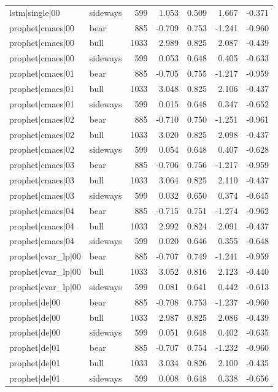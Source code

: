 \begin{table}
\begin{tabular}{llrrrrr}
lstm|single|00 & sideways & 599 & 1.053 & 0.509 & 1.667 & -0.371 \\
prophet|cmaes|00 & bear & 885 & -0.709 & 0.753 & -1.241 & -0.960 \\
prophet|cmaes|00 & bull & 1033 & 2.989 & 0.825 & 2.087 & -0.439 \\
prophet|cmaes|00 & sideways & 599 & 0.053 & 0.648 & 0.405 & -0.633 \\
prophet|cmaes|01 & bear & 885 & -0.705 & 0.755 & -1.217 & -0.959 \\
prophet|cmaes|01 & bull & 1033 & 3.048 & 0.825 & 2.106 & -0.437 \\
prophet|cmaes|01 & sideways & 599 & 0.015 & 0.648 & 0.347 & -0.652 \\
prophet|cmaes|02 & bear & 885 & -0.710 & 0.750 & -1.251 & -0.961 \\
prophet|cmaes|02 & bull & 1033 & 3.020 & 0.825 & 2.098 & -0.437 \\
prophet|cmaes|02 & sideways & 599 & 0.054 & 0.648 & 0.407 & -0.628 \\
prophet|cmaes|03 & bear & 885 & -0.706 & 0.756 & -1.217 & -0.959 \\
prophet|cmaes|03 & bull & 1033 & 3.064 & 0.825 & 2.110 & -0.437 \\
prophet|cmaes|03 & sideways & 599 & 0.032 & 0.650 & 0.374 & -0.645 \\
prophet|cmaes|04 & bear & 885 & -0.715 & 0.751 & -1.274 & -0.962 \\
prophet|cmaes|04 & bull & 1033 & 2.992 & 0.824 & 2.091 & -0.437 \\
prophet|cmaes|04 & sideways & 599 & 0.020 & 0.646 & 0.355 & -0.648 \\
prophet|cvar\_lp|00 & bear & 885 & -0.707 & 0.749 & -1.241 & -0.959 \\
prophet|cvar\_lp|00 & bull & 1033 & 3.052 & 0.816 & 2.123 & -0.440 \\
prophet|cvar\_lp|00 & sideways & 599 & 0.081 & 0.641 & 0.442 & -0.613 \\
prophet|de|00 & bear & 885 & -0.708 & 0.753 & -1.237 & -0.960 \\
prophet|de|00 & bull & 1033 & 2.987 & 0.825 & 2.086 & -0.439 \\
prophet|de|00 & sideways & 599 & 0.051 & 0.648 & 0.402 & -0.635 \\
prophet|de|01 & bear & 885 & -0.707 & 0.754 & -1.232 & -0.960 \\
prophet|de|01 & bull & 1033 & 3.034 & 0.826 & 2.100 & -0.435 \\
prophet|de|01 & sideways & 599 & 0.008 & 0.648 & 0.338 & -0.656 \\

\end{tabular}
\end{table}
